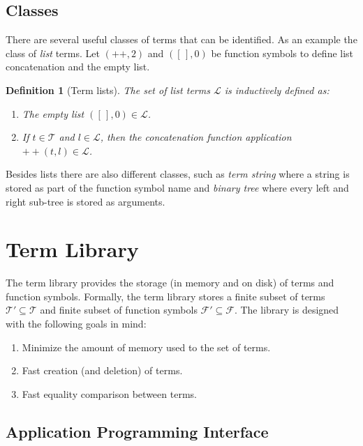 \documentclass[10pt,a4paper]{article}
\newtheorem{definition}{Definition}
\newcommand{\functionsymbols}{\mathcal{F}}
\newcommand{\listempty}{[\,]}
\newcommand{\listconcat}{+\!\!+}
\newcommand{\lists}{\mathcal{L}}
\newcommand{\terms}{\mathcal{T}}
\begin{document}
\subsection{Classes}

There are several useful classes of terms that can be identified.
As an example the class of \emph{list} terms. 
Let $(\listconcat, 2)$ and $(\listempty, 0)$ be function symbols to define list concatenation and the empty list.

\begin{definition}[Term lists]
The set of \emph{list} terms $\lists$ is inductively defined as:

\begin{enumerate}
  \item The \emph{empty} list $(\listempty, 0) \in \lists$.
  
  \item If $t \in \terms$ and $l \in \lists$, then the \emph{concatenation} function application $\listconcat(t, l) \in \lists$.
\end{enumerate}
\end{definition}

\noindent Besides lists there are also different classes, such as \emph{term string} where a string is stored as part of the function symbol name and \emph{binary tree} where every left and right sub-tree is stored as arguments.

\section{Term Library}\label{section:library}

The term library provides the storage (in memory and on disk) of terms and function symbols. 
Formally, the term library stores a finite subset of terms $\terms' \subseteq \terms$ and finite subset of function symbols $\functionsymbols' \subseteq \functionsymbols$.
The library is designed with the following goals in mind:

\begin{enumerate}
	\item Minimize the amount of memory used to the set of terms.
	
	\item Fast creation (and deletion) of terms.
	
	\item Fast equality comparison between terms.
\end{enumerate}

\subsection{Application Programming Interface}
\end{document}
